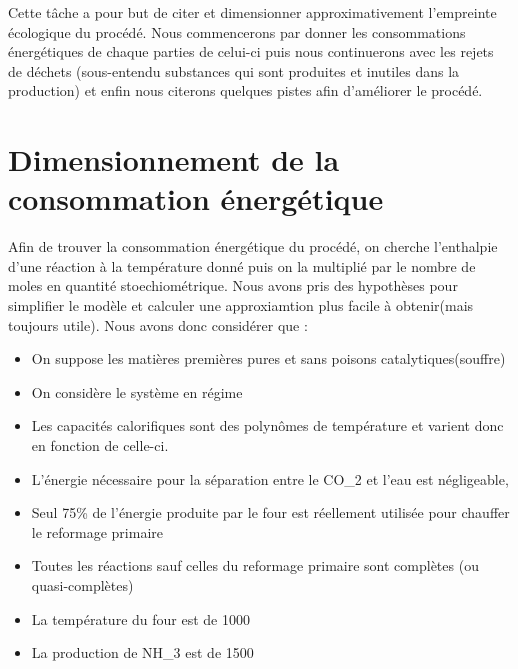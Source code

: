 
Cette tâche a pour but de citer et dimensionner approximativement l'empreinte écologique du procédé. Nous commencerons par donner les consommations énergétiques de chaque parties de celui-ci puis nous continuerons avec les rejets de déchets (sous-entendu substances qui sont produites et inutiles dans la production) et enfin nous citerons quelques pistes afin d'améliorer le procédé.

\section{Dimensionnement de la consommation énergétique}
\label{dim}
Afin de trouver la consommation énergétique du procédé, on cherche l'enthalpie d'une réaction à la température donné puis on la multiplié par le nombre de moles en quantité stoechiométrique. Nous avons pris des hypothèses pour simplifier le modèle et calculer une approxiamtion plus facile à obtenir(mais toujours utile). Nous avons donc considérer que :
\begin{itemize}
	\item On suppose les matières premières pures et sans poisons catalytiques(souffre)
	\item On considère le système en régime
  \item Les capacités calorifiques sont des polynômes de température et varient donc en fonction de celle-ci.
	\item L'énergie nécessaire pour la séparation entre le CO_{2} et l'eau est négligeable,
	\item Seul 75\% de l'énergie produite par le four est réellement utilisée pour chauffer le reformage primaire
	\item Toutes les réactions sauf celles du reformage primaire sont complètes (ou quasi-complètes)
	\item La température du four est de \unit{1000}{\kelvin}
	\item La production de NH_{3} est de \unit{1500}{\tons\per\dday}
\end{itemize}
	
